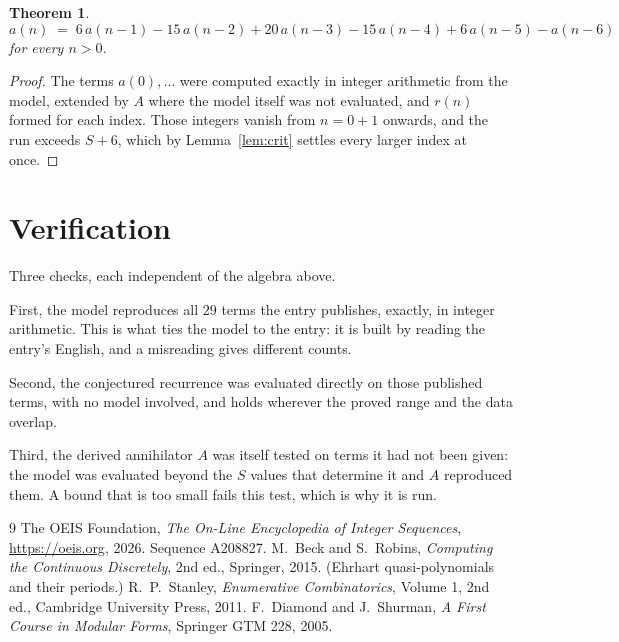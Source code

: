 \documentclass[11pt,a4paper]{article}
\theoremstyle{plain}
\newtheorem{theorem}{Theorem}
\theoremstyle{definition}
\begin{document}
\begin{theorem}
\[
a(n)\;=\;6\,a(n-1) - 15\,a(n-2) + 20\,a(n-3) - 15\,a(n-4) + 6\,a(n-5) - a(n-6)
\]
for every $n>0$.
\end{theorem}

\begin{proof}
The terms $a(0),\dots$ were computed exactly in integer arithmetic from the model, extended by
$A$ where the model itself was not evaluated, and $r(n)$ formed for each index. Those integers
vanish from $n=0+1$ onwards, and the run exceeds $S+6$, which by
Lemma~\ref{lem:crit} settles every larger index at once.
\end{proof}

\section{Verification}

Three checks, each independent of the algebra above.

First, the model reproduces all $29$ terms the entry publishes, exactly, in integer
arithmetic. This is what ties the model to the entry: it is built by reading the entry's
English, and a misreading gives different counts.

Second, the conjectured recurrence was evaluated directly on those published terms, with no
model involved, and holds wherever the proved range and the data overlap.

Third, the derived annihilator $A$ was itself tested on terms it had not been given: the model
was evaluated beyond the $S$ values that determine it and $A$ reproduced them. A bound that is
too small fails this test, which is why it is run.

\begin{thebibliography}{9}
 The OEIS Foundation, \emph{The On-Line Encyclopedia of Integer
Sequences}, \url{https://oeis.org}, 2026. Sequence A208827.
 M.~Beck and S.~Robins, \emph{Computing the Continuous Discretely},
2nd ed., Springer, 2015. (Ehrhart quasi-polynomials and their periods.)
 R.~P.~Stanley, \emph{Enumerative Combinatorics}, Volume 1, 2nd ed.,
Cambridge University Press, 2011.
 F.~Diamond and J.~Shurman, \emph{A First Course in Modular Forms},
Springer GTM 228, 2005.
\end{thebibliography}
\end{document}
